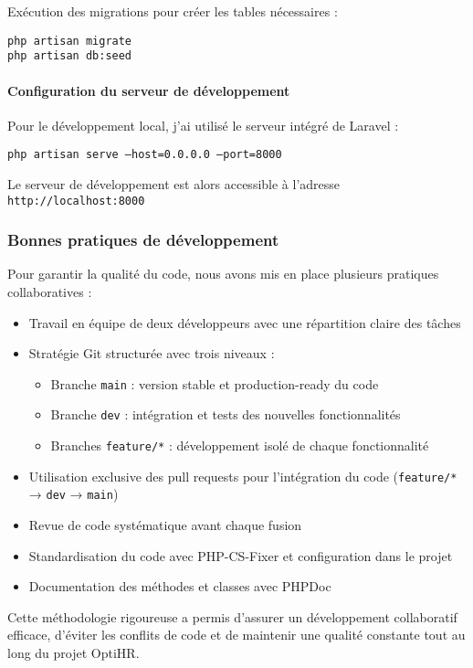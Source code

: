 Exécution des migrations pour créer les tables nécessaires :

\begin{tcolorbox}[colback=black, coltext=white, title=Exécution des migrations, fonttitle=\bfseries]
\texttt{php artisan migrate} \\
\texttt{php artisan db:seed}
\end{tcolorbox}

\paragraph{Configuration du serveur de développement}
Pour le développement local, j'ai utilisé le serveur intégré de Laravel :

\begin{tcolorbox}[colback=black, coltext=white, title=Lancement du serveur de développement, fonttitle=\bfseries]
\texttt{php artisan serve --host=0.0.0.0 --port=8000}
\end{tcolorbox}

Le serveur de développement est alors accessible à l'adresse \texttt{http://localhost:8000}

\subsubsection{Bonnes pratiques de développement}
Pour garantir la qualité du code, nous avons mis en place plusieurs pratiques collaboratives :

\begin{itemize}
    \item Travail en équipe de deux développeurs avec une répartition claire des tâches
    \item Stratégie Git structurée avec trois niveaux :
    \begin{itemize}
        \item Branche \texttt{main} : version stable et production-ready du code
        \item Branche \texttt{dev} : intégration et tests des nouvelles fonctionnalités
        \item Branches \texttt{feature/*} : développement isolé de chaque fonctionnalité
    \end{itemize}
    \item Utilisation exclusive des pull requests pour l'intégration du code (\texttt{feature/*} → \texttt{dev} → \texttt{main})
    \item Revue de code systématique avant chaque fusion
    \item Standardisation du code avec PHP-CS-Fixer et configuration dans le projet
    \item Documentation des méthodes et classes avec PHPDoc
\end{itemize}

Cette méthodologie rigoureuse a permis d'assurer un développement collaboratif efficace, d'éviter les conflits de code et de maintenir une qualité constante tout au long du projet OptiHR.
\clearpage
